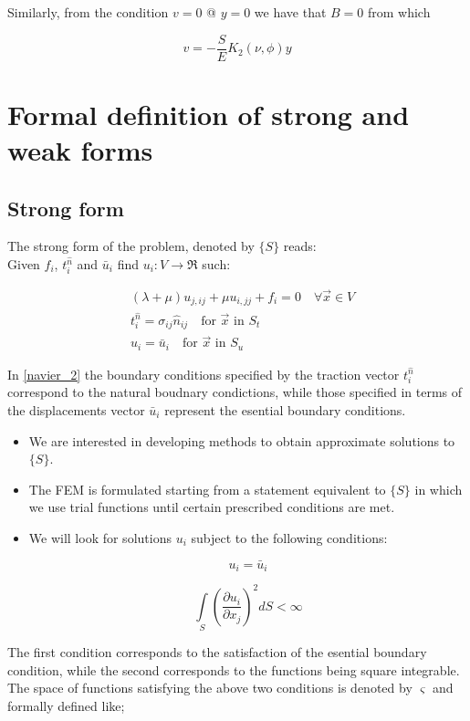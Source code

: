 Similarly, from the condition $v=0$ @ $y=0$ we have that $B=0$ from which

\[v=-\dfrac{S}{E} K_{2}(\nu , \phi)y\]


\section{Formal definition of strong and weak forms}
\subsection*{Strong form}
The strong form of the problem, denoted by $\{ S \}$ reads:\\

Given $f_i$, $t_i^{\hat n}$ and ${\bar u_i}$ find ${u_i}:V \to \Re$ such:

\begin{equation} \label{navier_2}
\begin{split}
&\left( {\lambda  + \mu } \right){u_{j,ij}} + \mu {u_{i,jj}} + {f_i} = 0 \quad \text{$\forall \vec x \in V$} \\
&t_i^{\hat n} = {\sigma _{ij}}{\hat n_{ij}} \quad \text{for $\vec x$ in $S_t$}\\
& {u_i} = {{\bar u}_i} \quad \text{for $\vec x$ in $S_u$}
\end{split}
\end{equation}

In \cref{navier_2} the boundary conditions specified by the traction vector $t_i^{\hat n}$ correspond to the natural boudnary condictions, while those specified in terms of the displacements vector $\bar u_i$ represent the esential boundary conditions.

\begin{itemize}
\item We are interested in developing methods to obtain approximate solutions to $\{ S \}$.
\item The FEM is formulated starting from a statement equivalent to $\{ S \}$ in which we use trial functions until certain prescribed conditions are met.
\item We will look for solutions $u_i$ subject to the following conditions:

\[u_i=\bar u_i\]

\[\int\limits_S {{{\left( {\frac{{\partial {u_i}}}{{\partial {x_j}}}} \right)}^2}} dS < \infty \]

\end{itemize}

The first condition corresponds to the satisfaction of the esential boundary condition, while the second corresponds to the functions being square integrable. The space of functions satisfying the above two conditions is denoted by $\varsigma$ and formally defined like;

